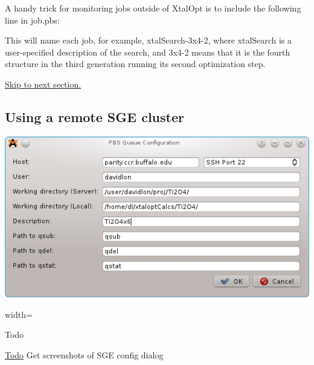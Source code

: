 A handy trick for monitoring jobs outside of Xtal\-Opt is to include the following line in job.\-pbs\-:




This will name each job, for example, xtal\-Search-\/3x4-\/2, where xtal\-Search is a user-\/specified description of the search, and 3x4-\/2 means that it is the fourth structure in the third generation running its second optimization step.

\hyperlink{tut-xo_files}{Skip to next section.}\hypertarget{tut-xo_remotesge}{}\subsection{Using a remote S\-G\-E cluster}\label{tut-xo_remotesge}
 
\begin{DoxyImage}
\includegraphics{opt-set-pbs.png}
\caption{width=}
\end{DoxyImage}
 \begin{DoxyRefDesc}{Todo}
\item[\hyperlink{todo__todo000001}{Todo}]Get screenshots of S\-G\-E config dialog\end{DoxyRefDesc}


